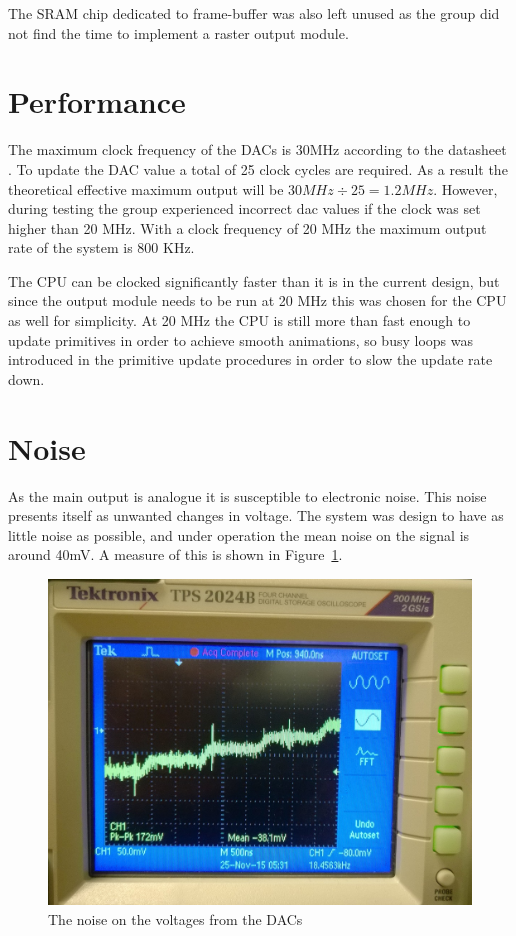 The SRAM chip dedicated to frame-buffer was also left unused as the group did not find the time to implement a raster output module.

\section{Performance}

The maximum clock frequency of the DACs is 30MHz according to the datasheet \cite{dac-datasheet}.
To update the DAC value a total of 25 clock cycles are required.
As a result the theoretical effective maximum output will be \(30 MHz \div 25 = 1.2 MHz \).
However, during testing the group experienced incorrect \gls{dac} values if the clock was set higher than 20 MHz.
With a clock frequency of 20 MHz the maximum output rate of the system is 800 KHz.

The CPU can be clocked significantly faster than it is in the current design, but since the output module needs to be run at 20 MHz this was chosen for the CPU as well for simplicity.
At 20 MHz the CPU is still more than fast enough to update primitives in order to achieve smooth animations, so busy loops was introduced in the primitive update procedures in order to slow the update rate down.

\section{Noise}
\label{sec:noise}
As the main output is analogue it is susceptible to electronic noise. This noise presents itself as unwanted changes in voltage. 
The system was design to have as little noise as possible, and under operation the mean noise on the signal is around 40mV.
A measure of this is shown in Figure~\ref{fig:noise}.

\begin{figure}[H]
	    \includegraphics[width=\linewidth]{images/noise}
	    \caption{The noise on the voltages from the DACs}
	    \label{fig:noise}
\end{figure}

